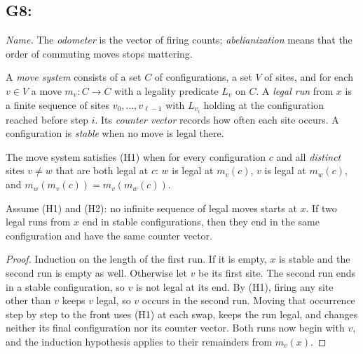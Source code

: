\subsection{G8: \lawGEight}\label{sec:G8}\label{sec:abelian}

\emph{Name.} The \emph{odometer} is the vector of firing counts; \emph{abelianization} means that
the order of commuting moves stops mattering.

\begin{definition}\label{def:move-system}
A \emph{move system} consists of a set $C$ of configurations, a set $V$ of sites, and for each
$v \in V$ a move $m_v : C \to C$ with a legality predicate $L_v$ on $C$. A \emph{legal run} from $x$
is a finite sequence of sites $v_0, \ldots, v_{\ell-1}$ with $L_{v_i}$ holding at the configuration
reached before step $i$. Its \emph{counter vector} records how often each site occurs. A
configuration is \emph{stable} when no move is legal there.
\end{definition}

\begin{definition}\label{def:abelian}
The move system satisfies \textup{(H1)} when for every configuration $c$ and all \emph{distinct}
sites $v \ne w$ that are both legal at $c$: $w$ is legal at $m_v(c)$, $v$ is legal at $m_w(c)$,
and $m_w(m_v(c)) = m_v(m_w(c))$.
\end{definition}

\begin{theorem}\label{thm:G8}
Assume \textup{(H1)} and \textup{(H2)}: no infinite sequence of legal moves starts at $x$. If two
legal runs from $x$ end in stable configurations, then they end in the same configuration and have
the same counter vector.
\end{theorem}

\begin{proof}
Induction on the length of the first run. If it is empty, $x$ is stable and the second run is empty
as well. Otherwise let $v$ be its first site. The second run ends in a stable configuration, so $v$
is not legal at its end. By (H1), firing any site other than $v$ keeps $v$ legal, so $v$ occurs in
the second run. Moving that occurrence step by step to the front uses (H1) at each swap, keeps the
run legal, and changes neither its final configuration nor its counter vector. Both runs now begin
with $v$, and the induction hypothesis applies to their remainders from $m_v(x)$.
\end{proof}

